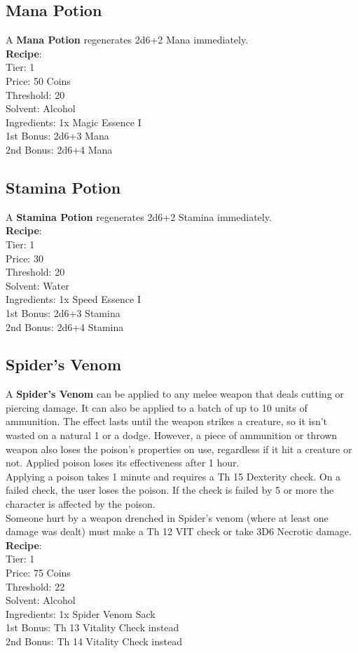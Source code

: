 \subsection{Mana Potion}\label{potion:manaPotion}
A \textbf{Mana Potion} regenerates 2d6+2 Mana immediately.\\
\textbf{Recipe}:\\
Tier: 1\\
Price: 50 Coins\\
Threshold: 20\\
Solvent: Alcohol\\
Ingredients: 1x Magic Essence I\\
1st Bonus: 2d6+3 Mana\\
2nd Bonus: 2d6+4 Mana\\

\subsection{Stamina Potion}\label{potion:staminaPotion}
A \textbf{Stamina Potion} regenerates 2d6+2 Stamina immediately.\\
\textbf{Recipe}:\\
Tier: 1\\
Price: 30\\
Threshold: 20\\
Solvent: Water\\
Ingredients: 1x Speed Essence I\\
1st Bonus: 2d6+3 Stamina\\
2nd Bonus: 2d6+4 Stamina\\

\subsection{Spider's Venom}\label{potion:spidersVenom}
A \textbf{Spider's Venom} can be applied to any melee weapon that deals cutting or piercing damage.
It can also be applied to a batch of up to 10 units of ammunition.
The effect lasts until the weapon strikes a creature, so it isn't wasted on a natural 1 or a dodge.
However, a piece of ammunition or thrown weapon also loses the poison's properties on use, regardless if it hit a creature or not.
Applied poison loses its effectiveness after 1 hour.\\
Applying a poison takes 1 minute and requires a Th 15 Dexterity check.
On a failed check, the user loses the poison.
If the check is failed by 5 or more the character is affected by the poison.\\
Someone hurt by a weapon drenched in Spider's venom (where at least one damage was dealt) must make a Th 12 VIT check or take 3D6 Necrotic damage.\\
\textbf{Recipe}:\\
Tier: 1\\
Price: 75 Coins\\
Threshold: 22\\
Solvent: Alcohol\\
Ingredients: 1x Spider Venom Sack\\
1st Bonus: Th 13 Vitality Check instead\\
2nd Bonus: Th 14 Vitality Check instead\\



